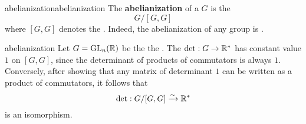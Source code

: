 \begin{topic}{abelianization}{abelianization}
    The \textbf{abelianization} of a  $G$ is the 
    \[ G/[G, G] \]
    where $[G, G]$ denotes the . Indeed, the abelianization of any group is .
\end{topic}

\begin{example}{abelianization}
    Let $G = \textup{GL}_n(\mathbb{R})$ be the the . The  $\det : G \to \mathbb{R}^*$ has constant value $1$ on $[G, G]$, since the determinant of products of commutators is always $1$. Conversely, after showing that any matrix of determinant $1$ can be written as a product of commutators, it follows that
    \[ \det : G / [G, G] \xrightarrow{\sim} \mathbb{R}^* \]
    is an isomorphism.
\end{example}
